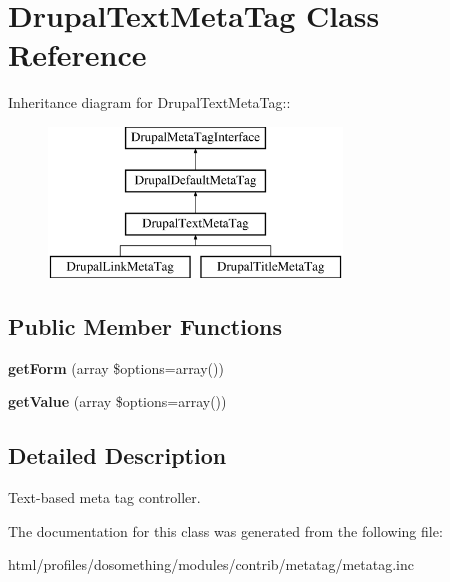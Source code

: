 \hypertarget{classDrupalTextMetaTag}{
\section{DrupalTextMetaTag Class Reference}
\label{classDrupalTextMetaTag}
}
Inheritance diagram for DrupalTextMetaTag::\begin{figure}[H]
\begin{center}
\leavevmode
\includegraphics[height=4cm]{classDrupalTextMetaTag}
\end{center}
\end{figure}
\subsection*{Public Member Functions}
\begin{DoxyCompactItemize}
\item 
\hypertarget{classDrupalTextMetaTag_a463c243a27d9e3179dc19d0c7ba1b56c}{
{\bfseries getForm} (array \$options=array())}
\label{classDrupalTextMetaTag_a463c243a27d9e3179dc19d0c7ba1b56c}

\item 
\hypertarget{classDrupalTextMetaTag_a4a3bc11434d1ea0af4ae7e05e22d18ec}{
{\bfseries getValue} (array \$options=array())}
\label{classDrupalTextMetaTag_a4a3bc11434d1ea0af4ae7e05e22d18ec}

\end{DoxyCompactItemize}


\subsection{Detailed Description}
Text-\/based meta tag controller. 

The documentation for this class was generated from the following file:\begin{DoxyCompactItemize}
\item 
html/profiles/dosomething/modules/contrib/metatag/metatag.inc\end{DoxyCompactItemize}

